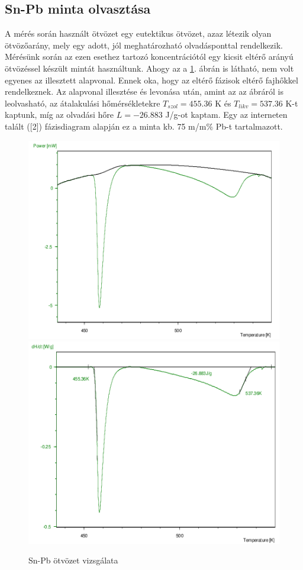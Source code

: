 \documentclass[12pt,a4paper]{article}
\begin{document}
\subsection{Sn-Pb minta olvasztása}
\hspace*{10pt} A mérés során használt ötvözet egy eutektikus ötvözet, azaz létezik olyan ötvözőarány, mely egy adott, jól meghatározható olvadásponttal rendelkezik. Mérésünk során az ezen esethez tartozó koncentrációtól egy kicsit eltérő arányú ötvözéssel készült mintát használtunk. Ahogy az a \ref{fig:snpb}. ábrán is látható, nem volt egyenes az illesztett alapvonal. Ennek oka, hogy az eltérő fázisok eltérő fajhőkkel rendelkeznek. Az alapvonal illesztése és levonása után, amint az az ábráról is leolvasható, az átalakulási hőmérsékletekre $T_{szol}=455.36$ K és $T_{likv}=537.36$ K-t kaptunk, míg az olvadási hőre $L=-26.883$ J/g-ot kaptam. Egy az interneten talált ([2]) fázisdiagram alapján ez a minta kb. 75 m/m$\%$ Pb-t tartalmazott.
\begin{figure}[!h]
\hspace*{-20pt}
  \includegraphics[width=\linewidth]{3fin}
\endminipage
\hspace*{10pt}
  \includegraphics[width=\linewidth]{4fin}
\endminipage
\caption{Sn-Pb ötvözet vizsgálata}
\label{fig:snpb}
\end{figure}
\newpage
\end{document}
